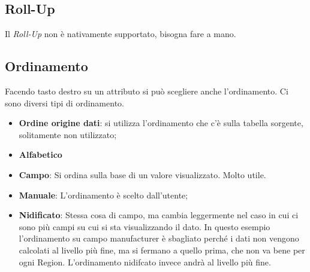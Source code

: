 \subsection{Roll-Up}
Il \textit{Roll-Up} non è nativamente supportato, bisogna fare a mano.\newline
\subsection{Ordinamento}
Facendo tasto destro su un attributo si può scegliere anche l'ordinamento. Ci sono diversi tipi di ordinamento.
\begin{itemize}
	\item \textbf{Ordine origine dati}: si utilizza l'ordinamento che c'è sulla tabella sorgente, solitamente non utilizzato;
	\item \textbf{Alfabetico}
	\item \textbf{Campo}: Si ordina sulla base di un valore visualizzato. Molto utile.
	\item \textbf{Manuale}: L'ordinamento è scelto dall'utente;
	\item \textbf{Nidificato}: Stessa cosa di campo, ma cambia leggermente nel caso in cui ci sono più campi su cui si sta visualizzando il dato.
	In questo esempio l'ordinamento su campo manufacturer è sbagliato perché i dati non vengono calcolati al livello più fine, ma si fermano a quello prima, che non va bene per ogni Region. L'ordinamento nidifcato invece andrà al livello più fine.
\end{itemize}
